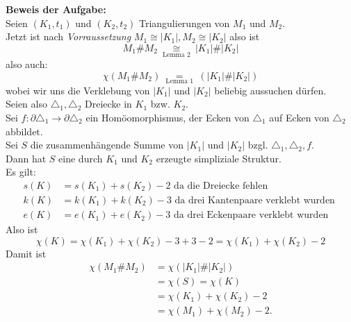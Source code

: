 \begin{problem*}[2]
\textbf{Beweis der Aufgabe:} \\
Seien $ (K_1, t_1) $ und $(K_2, t_2)$ Triangulierungen von $ M_1 $ und $ M_2 $.\\
Jetzt ist nach \emph{Vorraussetzung} $ M_1 \cong \vert K_1 \vert, M_2 \cong \vert K_2 \vert$ also ist
\begin{equation*}   
M_1 \# M_2 \underset{ \text{ Lemma 2 } }{ \cong } \vert K_1 \vert \# \vert K_2 \vert
 \end{equation*} 
 also auch:
 $$
   \chi (M_1 \# M_2) \underset{ \text{ Lemma 1 } }{ = } (\vert K_1 \vert \# \vert K_2 \vert)
 $$
 wobei wir uns die Verklebung von $ \vert K_1 \vert $ und $\vert K_2 \vert$ beliebig aussuchen dürfen.\\
 Seien also $\triangle_1, \triangle_2$ Dreiecke in $ K_1 $ bzw. $ K_2 $. \\
 Sei $ f: \partial \triangle_1 \to \partial \triangle_2 $ ein Homöomorphismus, der Ecken von $\triangle_1$ auf Ecken von $\triangle_2$ abbildet. \\
 Sei $ S $ die zusammenhängende Summe von $ \vert K_1 \vert $ und $\vert K_2 \vert$ bzgl. 
 $\triangle_1, \triangle_2, f$.\\
 Dann hat $S$ eine durch $ K_1 $ und $ K_2 $ erzeugte simpliziale Struktur.\\
 Es gilt:
 \begin{align*}
   s(K) &= s(K_1) + s(K_2) - 2 \text{ da die Dreiecke fehlen }\\
   k(K) &= k(K_1) + k(K_2) - 3 \text{ da drei Kantenpaare verklebt wurden }\\
   e(K) &= e(K_1) + e(K_2) - 3 \text{ da drei Eckenpaare verklebt wurden}
 \end{align*}
 Also ist 
 $$ \chi(K) = \chi(K_1) + \chi(K_2) - 3 + 3 -2 = \chi(K_1) + \chi(K_2) - 2 $$
 Damit ist 
 \begin{align*}
    \chi(M_1 \# M_2) &= \chi(\vert K_1 \vert \# \vert K_2 \vert) \\
    &= \chi(S) = \chi(K) \\
    &= \chi(K_1) + \chi(K_2) - 2 \\
    &= \chi(M_1) + \chi(M_2) - 2.
  \end{align*} 
\end{problem*}

